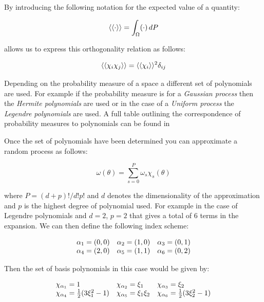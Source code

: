 By introducing the following notation for the expected value of a quantity:

\begin{equation}\label{eq:oned-stochastic-expect-notation}
    \left\langle\langle\cdot\right\rangle\rangle = \int_{\Omega}(\cdot) \,dP
\end{equation}

allows us to express this orthogonality relation as follows:

\begin{equation}\label{oned-stochastic-orthog-relation}
    \left\langle\langle\chi_i\chi_j\right\rangle\rangle = \left\langle\langle\chi_i\right\rangle\rangle^2\delta_{ij}
\end{equation}

Depending on the probability measure of a space a different set of polynomials
are used. For example if the probability measure is for a
\textit{Gaussian process} then the \textit{Hermite polynomials} are used or in
the case of a \textit{Uniform process} the \textit{Legendre polynomials} are
used. A full table outlining the correspondence of probability measures to
polynomials can be found in \cite{general-poly-chaos}

Once the set of polynomials have been determined you can approximate a random
process as follows:

\begin{equation}
    \omega(\theta) = \sum_{s=0}^P\omega_s\chi_s(\theta)
\end{equation}

where $P = (d + p)!/d!p!$ and $d$ denotes the dimensionality of the
approximation and $p$ is the highest degree of polynomial used. For example in
the case of Legendre polynomials and $d=2$, $p=2$ that gives a total of 6
terms in the expansion. We can then define the following index scheme:

\begin{equation}
  \begin{array}{c c c }
    \alpha_1 = (0,0) & \alpha_2 = (1,0) & \alpha_3 = (0,1) \\
    \alpha_4 = (2,0) & \alpha_5 = (1,1) & \alpha_6 = (0,2)
  \end{array}
\end{equation}

Then the set of basis polynomials in this case would be given by:

\begin{equation}
  \begin{array}{l l l}
    \chi_{\alpha_1} = 1 & \chi_{\alpha_2} = \xi_1 & \chi_{\alpha_3} = \xi_2 \\
    \chi_{\alpha_4} = \frac{1}{2}(3\xi_1^2 - 1) &
    \chi_{\alpha_5} = \xi_1\xi_2 &
    \chi_{\alpha_6} = \frac{1}{2}(3\xi_2^2 - 1)
  \end{array}
\end{equation}


